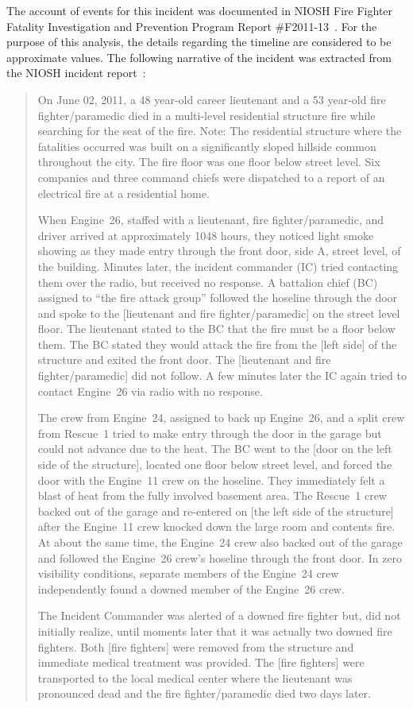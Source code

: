 \documentclass[12pt,oneside]{book}
\begin{document}
The account of events for this incident was documented in NIOSH Fire Fighter Fatality Investigation and Prevention Program Report \#F2011-13~\cite{NIOSH:Bowyer2}. For the purpose of this analysis, the details regarding the timeline are considered to be approximate values. The following narrative of the incident was extracted from the NIOSH incident report~\cite{NIOSH:Bowyer2}:
\begin{quote}
On June 02, 2011, a 48 year-old career lieutenant and a 53 year-old fire fighter/paramedic died in a multi-level residential structure fire while searching for the seat of the fire. Note: The residential structure where the fatalities occurred was built on a significantly sloped hillside common throughout the city. The fire floor was one floor below street level. Six companies and three command chiefs were dispatched to a report of an electrical fire at a residential home.

When Engine~26, staffed with a lieutenant, fire fighter/paramedic, and driver arrived at approximately 1048 hours, they noticed light smoke showing as they made entry through the front door, side A, street level, of the building. Minutes later, the incident commander (IC) tried contacting them over the radio, but received no response. A battalion chief (BC) assigned to ``the fire attack group'' followed the hoseline through the door and spoke to the [lieutenant and fire fighter/paramedic] on the street level floor. The lieutenant stated to the BC that the fire must be a floor below them. The BC stated they would attack the fire from the [left side] of the structure and exited the front door. The [lieutenant and fire fighter/paramedic] did not follow. A few minutes later the IC again tried to contact Engine~26 via radio with no response.

The crew from Engine~24, assigned to back up Engine~26, and a split crew from Rescue~1 tried to make entry through the door in the garage but could not advance due to the heat. The BC went to the [door on the left side of the structure], located one floor below street level, and forced the door with the Engine~11 crew on the hoseline. They immediately felt a blast of heat from the fully involved basement area. The Rescue~1 crew backed out of the garage and re-entered on [the left side of the structure] after the Engine~11 crew knocked down the large room and contents fire. At about the same time, the Engine~24 crew also backed out of the garage and followed the Engine~26 crew's hoseline through the front door. In zero visibility conditions, separate members of the Engine~24 crew independently found a downed member of the Engine~26 crew.

The Incident Commander was alerted of a downed fire fighter but, did not initially realize, until moments later that it was actually two downed fire fighters. Both [fire fighters] were removed from the structure and immediate medical treatment was provided. The [fire fighters] were transported to the local medical center where the lieutenant was pronounced dead and the fire fighter/paramedic died two days later.
\end{quote}
\end{document}

